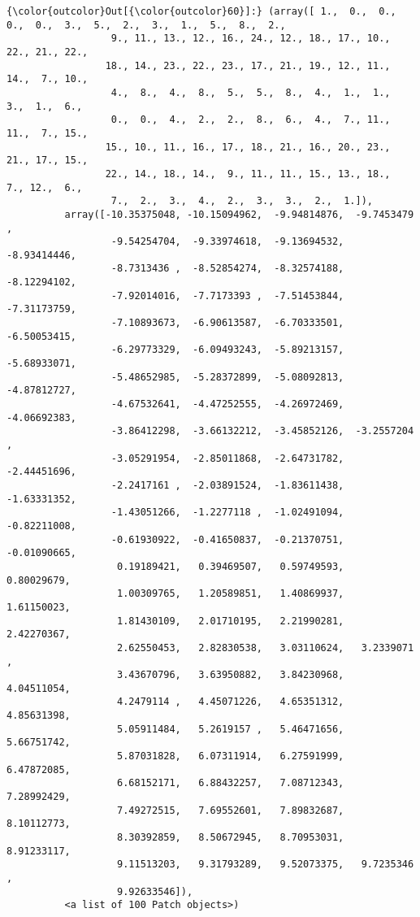 \documentclass[11pt]{article}
\begin{document}
\begin{Verbatim}[commandchars=\\\{\}]
{\color{outcolor}Out[{\color{outcolor}60}]:} (array([ 1.,  0.,  0.,  0.,  0.,  3.,  5.,  2.,  3.,  1.,  5.,  8.,  2.,
                  9., 11., 13., 12., 16., 24., 12., 18., 17., 10., 22., 21., 22.,
                 18., 14., 23., 22., 23., 17., 21., 19., 12., 11., 14.,  7., 10.,
                  4.,  8.,  4.,  8.,  5.,  5.,  8.,  4.,  1.,  1.,  3.,  1.,  6.,
                  0.,  0.,  4.,  2.,  2.,  8.,  6.,  4.,  7., 11., 11.,  7., 15.,
                 15., 10., 11., 16., 17., 18., 21., 16., 20., 23., 21., 17., 15.,
                 22., 14., 18., 14.,  9., 11., 11., 15., 13., 18.,  7., 12.,  6.,
                  7.,  2.,  3.,  4.,  2.,  3.,  3.,  2.,  1.]),
          array([-10.35375048, -10.15094962,  -9.94814876,  -9.7453479 ,
                  -9.54254704,  -9.33974618,  -9.13694532,  -8.93414446,
                  -8.7313436 ,  -8.52854274,  -8.32574188,  -8.12294102,
                  -7.92014016,  -7.7173393 ,  -7.51453844,  -7.31173759,
                  -7.10893673,  -6.90613587,  -6.70333501,  -6.50053415,
                  -6.29773329,  -6.09493243,  -5.89213157,  -5.68933071,
                  -5.48652985,  -5.28372899,  -5.08092813,  -4.87812727,
                  -4.67532641,  -4.47252555,  -4.26972469,  -4.06692383,
                  -3.86412298,  -3.66132212,  -3.45852126,  -3.2557204 ,
                  -3.05291954,  -2.85011868,  -2.64731782,  -2.44451696,
                  -2.2417161 ,  -2.03891524,  -1.83611438,  -1.63331352,
                  -1.43051266,  -1.2277118 ,  -1.02491094,  -0.82211008,
                  -0.61930922,  -0.41650837,  -0.21370751,  -0.01090665,
                   0.19189421,   0.39469507,   0.59749593,   0.80029679,
                   1.00309765,   1.20589851,   1.40869937,   1.61150023,
                   1.81430109,   2.01710195,   2.21990281,   2.42270367,
                   2.62550453,   2.82830538,   3.03110624,   3.2339071 ,
                   3.43670796,   3.63950882,   3.84230968,   4.04511054,
                   4.2479114 ,   4.45071226,   4.65351312,   4.85631398,
                   5.05911484,   5.2619157 ,   5.46471656,   5.66751742,
                   5.87031828,   6.07311914,   6.27591999,   6.47872085,
                   6.68152171,   6.88432257,   7.08712343,   7.28992429,
                   7.49272515,   7.69552601,   7.89832687,   8.10112773,
                   8.30392859,   8.50672945,   8.70953031,   8.91233117,
                   9.11513203,   9.31793289,   9.52073375,   9.7235346 ,
                   9.92633546]),
          <a list of 100 Patch objects>)
\end{Verbatim}
            
    \begin{center}
    \end{center}
    { \hspace*{\fill} \\}
    

    
    
    
    
\end{document}
